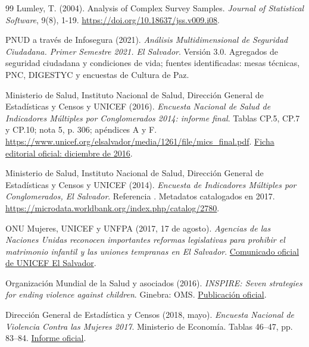 \documentclass[11pt,a4paper]{article}
\newcommand{\var}[1]{\texttt{\detokenize{#1}}}
\begin{document}
\begin{thebibliography}{99}
Lumley, T. (2004).
Analysis of Complex Survey Samples.
\emph{Journal of Statistical Software}, 9(8), 1-19.
\url{https://doi.org/10.18637/jss.v009.i08}.

PNUD a través de Infosegura (2021).
\emph{Análisis Multidimensional de Seguridad Ciudadana. Primer Semestre 2021.
El Salvador}. Versión 3.0. Agregados de seguridad ciudadana y condiciones de
vida; fuentes identificadas: mesas técnicas, PNC, DIGESTYC y encuestas de
Cultura de Paz.

Ministerio de Salud, Instituto Nacional de Salud, Dirección General de
Estadísticas y Censos y UNICEF (2016).
\emph{Encuesta Nacional de Salud de Indicadores Múltiples por Conglomerados
2014: informe final}. Tablas CP.5, CP.7 y CP.10; nota 5, p. 306; apéndices A y F.
\url{https://www.unicef.org/elsalvador/media/1261/file/mics_final.pdf}.
\href{https://www.unicef.org/elsalvador/informes/encuesta-nacional-de-salud-mics-2014}{Ficha editorial oficial: diciembre de 2016}.

Ministerio de Salud, Instituto Nacional de Salud, Dirección General de
Estadísticas y Censos y UNICEF (2014).
\emph{Encuesta de Indicadores Múltiples por Conglomerados, El Salvador}.
Referencia \var{SLV_2014_MICS_v01_M}. Metadatos catalogados en 2017.
\url{https://microdata.worldbank.org/index.php/catalog/2780}.

ONU Mujeres, UNICEF y UNFPA (2017, 17 de agosto).
\emph{Agencias de las Naciones Unidas reconocen importantes reformas
legislativas para prohibir el matrimonio infantil y las uniones tempranas en
El Salvador}.
\href{https://www.unicef.org/elsalvador/comunicados-prensa/agencias-de-las-naciones-unidas-reconocen-importantes-reformas-legislativas-para}{Comunicado oficial de UNICEF El Salvador}.

Organización Mundial de la Salud y asociados (2016).
\emph{INSPIRE: Seven strategies for ending violence against children}.
Ginebra: OMS.
\href{https://www.who.int/publications/i/item/inspire-seven-strategies-for-ending-violence-against-children}{Publicación oficial}.

Dirección General de Estadística y Censos (2018, mayo).
\emph{Encuesta Nacional de Violencia Contra las Mujeres 2017}.
Ministerio de Economía. Tablas 46--47, pp. 83--84.
\href{https://onec.bcr.gob.sv/observatorio.genero/docs/ENVCM\%2017.pdf}{Informe oficial}.


\end{thebibliography}
\end{document}
